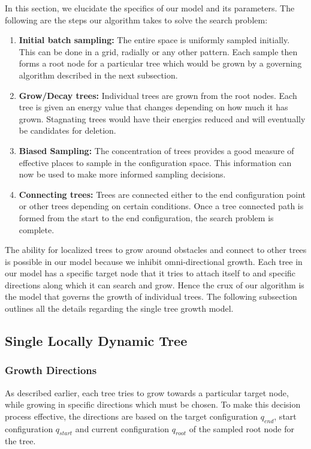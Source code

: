\documentclass[fleqn]{article}
\begin{document}
	In this section, we elucidate the specifics of our model and its parameters. The following are the steps our algorithm takes to solve the search problem:
	
	\begin{enumerate}
		\item \textbf{Initial batch sampling:} The entire space is uniformly sampled initially. This can be done in a grid, radially or any other pattern. Each sample then forms a root node for a particular tree which would be grown by a governing algorithm described in the next subsection.
		\item \textbf{Grow/Decay trees:} Individual trees are grown from the root nodes. Each tree is given an energy value that changes depending on how much it has grown. Stagnating trees would have their energies reduced and will eventually be candidates for deletion.
		\item \textbf{Biased Sampling:} The concentration of trees provides a good measure of effective places to sample in the configuration space. This information can now be used to make more informed sampling decisions.
		\item \textbf{Connecting trees:} Trees are connected either to the end configuration point or other trees depending on certain conditions. Once a tree connected path is formed from the start to the end configuration, the search problem is complete.
	\end{enumerate}
	
	The ability for localized trees to grow around obstacles and connect to other trees is possible in our model because we inhibit omni-directional growth. Each tree in our model has a specific target node that it tries to attach itself to and specific directions along which it can search and grow. Hence the crux of our algorithm is the model that governs the growth of individual trees. The following subsection outlines all the details regarding the single tree growth model.
	
	\subsection{Single Locally Dynamic Tree}
	
	\subsubsection{Growth Directions}
	
	As described earlier, each tree tries to grow towards a particular target node, while growing in specific directions which must be chosen. To make this decision process effective, the directions are based on the target configuration $q_{end}$, start configuration $q_{start}$ and current configuration $q_{root}$ of the sampled root node for the tree.
	
\end{document}
